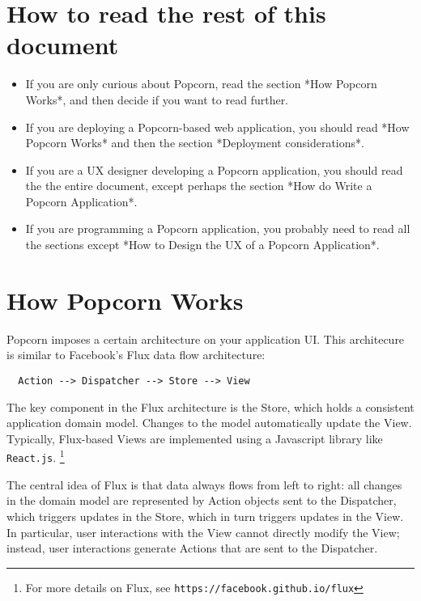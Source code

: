 \documentclass[12pt]{article}
\begin{document}
\section{How to read the rest of this document}

\begin{itemize}
\item If you are only curious about Popcorn, read the section *How Popcorn
Works*, and then decide if you want to read further.

\item If you are deploying a Popcorn-based web application, you should
read *How Popcorn Works* and then the section *Deployment
considerations*.

\item If you are a UX designer developing a Popcorn application, you
should read the the entire document, except perhaps the section *How
do Write a Popcorn Application*.

\item If you are programming a Popcorn application, you probably need to
read all the sections except *How to Design the UX of a Popcorn
Application*.
\end{itemize}

\section{How Popcorn Works}

Popcorn imposes a certain architecture on your application
UI. This architecure is similar to Facebook's Flux data flow
architecture:

\begin{verbatim}
  Action --> Dispatcher --> Store --> View
\end{verbatim}

The key component in the Flux architecture is the Store, which holds a
consistent application domain model. Changes to the model
automatically update the View. Typically, Flux-based Views are
implemented using a Javascript library like \verb`React.js`.
\footnote{For more details on Flux, see
\tt{https://facebook.github.io/flux}}

The central idea of Flux is that data always flows from left to right:
all changes in the domain model are represented by Action objects sent
to the Dispatcher, which triggers updates in the Store, which in turn
triggers updates in the View. In particular, user interactions with
the View cannot directly modify the View; instead, user interactions
generate Actions that are sent to the Dispatcher.
\end{document}

